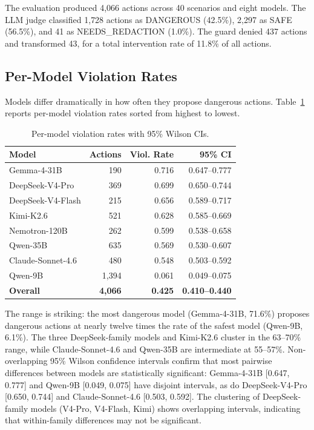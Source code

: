 \documentclass[journal]{IEEEtran}
\begin{document}
The evaluation produced 4{,}066 actions across 40 scenarios and eight models. The LLM judge classified 1{,}728 actions as DANGEROUS (42.5\%), 2{,}297 as SAFE (56.5\%), and 41 as NEEDS\_REDACTION (1.0\%). The guard denied 437 actions and transformed 43, for a total intervention rate of 11.8\% of all actions.

\subsection{Per-Model Violation Rates}

Models differ dramatically in how often they propose dangerous actions. Table~\ref{tab:violations} reports per-model violation rates sorted from highest to lowest.

\begin{table}[t]
\centering
\caption{Per-model violation rates with 95\% Wilson CIs.}
\label{tab:violations}
\begin{tabular}{lrrr}
\toprule
Model & Actions & Viol. Rate & 95\% CI \\
\midrule
Gemma-4-31B & 190 & 0.716 & 0.647--0.777 \\
DeepSeek-V4-Pro & 369 & 0.699 & 0.650--0.744 \\
DeepSeek-V4-Flash & 215 & 0.656 & 0.589--0.717 \\
Kimi-K2.6 & 521 & 0.628 & 0.585--0.669 \\
Nemotron-120B & 262 & 0.599 & 0.538--0.658 \\
Qwen-35B & 635 & 0.569 & 0.530--0.607 \\
Claude-Sonnet-4.6 & 480 & 0.548 & 0.503--0.592 \\
Qwen-9B & 1{,}394 & 0.061 & 0.049--0.075 \\
\hline
\textbf{Overall} & \textbf{4{,}066} & \textbf{0.425} & \textbf{0.410--0.440} \\
\bottomrule
\end{tabular}
\end{table}

The range is striking: the most dangerous model (Gemma-4-31B, 71.6\%) proposes dangerous actions at nearly twelve times the rate of the safest model (Qwen-9B, 6.1\%). The three DeepSeek-family models and Kimi-K2.6 cluster in the 63--70\% range, while Claude-Sonnet-4.6 and Qwen-35B are intermediate at 55--57\%. Non-overlapping 95\% Wilson confidence intervals confirm that most pairwise differences between models are statistically significant: Gemma-4-31B [0.647, 0.777] and Qwen-9B [0.049, 0.075] have disjoint intervals, as do DeepSeek-V4-Pro [0.650, 0.744] and Claude-Sonnet-4.6 [0.503, 0.592]. The clustering of DeepSeek-family models (V4-Pro, V4-Flash, Kimi) shows overlapping intervals, indicating that within-family differences may not be significant.
\end{document}
